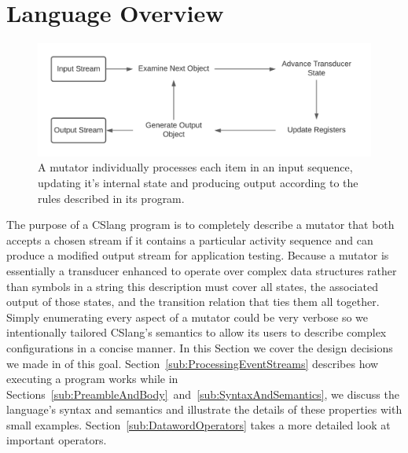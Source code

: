 \section{Language Overview}
\label{sec:Overview}

\begin{figure}
  \includegraphics[scale=.8]{images/processing}
  \caption{A mutator individually processes each item in an input
  sequence, updating it's internal state and producing output according
  to the rules described in its program.}
  \label{fig:Processing}
\end{figure}


The purpose
of a CSlang program is to completely describe a mutator
that both
accepts a chosen stream if it contains a particular
activity sequence and can produce a modified
output stream
for application testing.
Because a mutator is essentially a
transducer enhanced to operate over complex data structures
rather than symbols in a string
this description must cover all states,
the associated output of those states,
and the transition
relation that ties them all together.
Simply enumerating every aspect of a mutator could be very verbose
so we intentionally tailored CSlang's semantics to allow its users to
describe complex configurations in a concise manner.
In this Section we cover the design decisions we made
in of this goal.
Section~\ref{sub:ProcessingEventStreams} describes how executing a program works
while
in Sections~\ref{sub:PreambleAndBody}~and~\ref{sub:SyntaxAndSemantics},
we discuss the
language's syntax and semantics and illustrate the details
of these properties
with small examples.
Section~\ref{sub:DatawordOperators} takes a more
detailed look at important operators.

